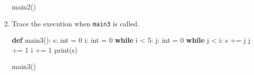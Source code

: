 \documentclass[]{article}
\newenvironment{Shaded}{}{}
\newcommand{\BuiltInTok}[1]{#1}
\newcommand{\ControlFlowTok}[1]{\textcolor[rgb]{0.00,0.44,0.13}{\textbf{#1}}}
\newcommand{\DecValTok}[1]{\textcolor[rgb]{0.25,0.63,0.44}{#1}}
\newcommand{\KeywordTok}[1]{\textcolor[rgb]{0.00,0.44,0.13}{\textbf{#1}}}
\newcommand{\NormalTok}[1]{#1}
\newcommand{\OperatorTok}[1]{\textcolor[rgb]{0.40,0.40,0.40}{#1}}
\begin{document}
\begin{enumerate}
\begin{Shaded}
\begin{Highlighting}[]
\NormalTok{main2()}
\end{Highlighting}
\end{Shaded}
\item
  Trace the execution when \texttt{main3} is called.

\begin{Shaded}
\begin{Highlighting}[]
\KeywordTok{def}\NormalTok{ main3():}
\NormalTok{    s: }\BuiltInTok{int} \OperatorTok{=} \DecValTok{0}
\NormalTok{    i: }\BuiltInTok{int} \OperatorTok{=} \DecValTok{0}
    \ControlFlowTok{while}\NormalTok{ i }\OperatorTok{<} \DecValTok{5}\NormalTok{:}
\NormalTok{        j: }\BuiltInTok{int} \OperatorTok{=} \DecValTok{0}
        \ControlFlowTok{while}\NormalTok{ j }\OperatorTok{<}\NormalTok{ i:}
\NormalTok{            s }\OperatorTok{+=}\NormalTok{ j}
\NormalTok{            j }\OperatorTok{+=} \DecValTok{1}
\NormalTok{        i }\OperatorTok{+=} \DecValTok{1}
    \BuiltInTok{print}\NormalTok{(s)}

\NormalTok{main3()}
\end{Highlighting}
\end{Shaded}
\end{enumerate}
\end{document}
